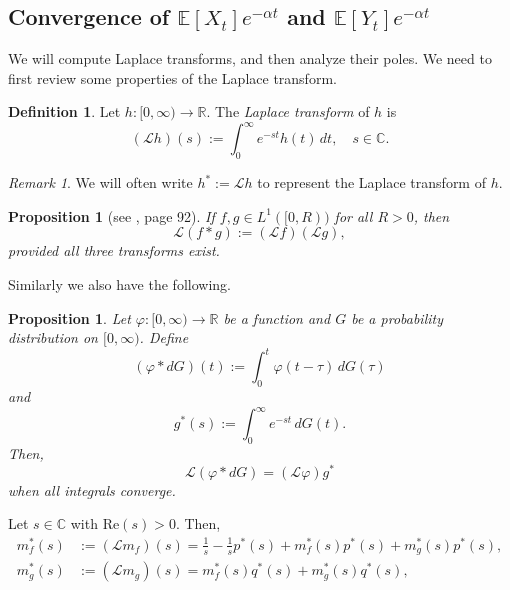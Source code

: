 \documentclass[12pt]{amsart}
\theoremstyle{plain}
\newtheorem{prop}[thm]{Proposition}
\theoremstyle{definition}
\newtheorem{defn}[thm]{Definition}
\theoremstyle{remark}
\newtheorem*{rem}{Remark}
\theoremstyle{definition}
\renewcommand{\Re}{\text{Re}}
\begin{document}
\subsection{Convergence of $\mathbb{E}[X_t]e^{-\alpha t}$ and $\mathbb{E}[Y_t]e^{-\alpha t}$}

We will compute Laplace transforms, and then analyze their poles.  We need to first review some properties of the Laplace transform.

\begin{defn}
Let $h: [0,\infty) \to \mathbb{R}$. The \emph{Laplace transform} of $h$ is
\begin{equation}
(\mathcal{L}h)(s) := \int_0^\infty e^{-st} h(t) \, dt, \quad s \in \mathbb{C}.
\end{equation}
\end{defn}
\begin{rem}
We will often write $h^* := \mathcal{L}h$ to represent the Laplace transform of $h$.
\end{rem}

\begin{prop}[see \cite{widder}, page 92]
If $f,g \in L^1([0,R))$ for all $R>0$, then
\begin{equation}
\mathcal{L}(f \ast g) := (\mathcal{L}f)(\mathcal{L}g),
\end{equation}
provided all three transforms exist.
\end{prop}

Similarly we also have the following.

\begin{prop}
Let $\varphi:[0,\infty) \to \mathbb{R}$ be a function and $G$ be a probability distribution on $[0,\infty)$. Define
\begin{equation}
(\varphi \ast dG)(t) := \int_0^t \varphi(t-\tau) \, dG(\tau)
\end{equation}
and
\begin{equation}
g^*(s) := \int_0^\infty e^{-st} \,dG(t).
\end{equation}
Then,
\begin{equation}
\mathcal{L}(\varphi \ast dG) = (\mathcal{L}\varphi) g^*
\end{equation}
when all integrals converge.
\end{prop}

Let $s \in \mathbb{C}$ with $\Re(s) > 0$. Then,
\begin{equation}
\begin{aligned}
m_f^*(s) & := (\mathcal{L}m_f)(s) = \frac{1}{s} - \frac{1}{s}p^*(s) + m_f^*(s)p^*(s) + m_g^*(s)p^*(s), \\
m_g^*(s) & := (\mathcal{L}m_g)(s) = m_f^*(s)q^*(s) + m_g^*(s)q^*(s),
\end{aligned}
\end{equation}
\end{document}
